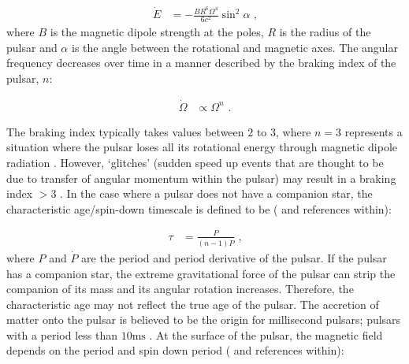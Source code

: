 \begin{equation}
    \begin{aligned}
    \dot{E}&=-\frac{BR^6\Omega^4}{6c^2}\sin^2\alpha\text{ ,}
    \end{aligned}
\end{equation}
where $B$ is the magnetic dipole strength at the poles, $R$ is the radius of the pulsar and $\alpha$ is the angle between the rotational and magnetic axes. The angular frequency decreases over time in a manner described by the braking index of the pulsar, $n$:

\begin{equation}
    \begin{aligned}
    \dot{\Omega} &\propto \Omega^n\text{ .}
    \end{aligned}
\end{equation}

The braking index typically takes values between $2\text{ to }3$, where $n=3$ represents a situation where the pulsar loses all its rotational energy through magnetic dipole radiation \citep{2007Ap&SS.308..317L}. However, `glitches' (sudden speed up events that are thought to be due to transfer of angular momentum within the pulsar) may result in a braking index $>3$ \citep{2019MNRAS.489.3810P,2020MNRAS.494.2012P}. In the case where a pulsar does not have a companion star, the characteristic age/spin-down timescale is defined to be (\cite{2007ASSL..326.....H} and references within):

\begin{equation}
    \begin{aligned}
    \tau&=\frac{P}{(n-1)\dot{P}} \text{ ,}
    \end{aligned} \label{eq:chapter1_characteristic_age}
\end{equation}
\noindent where $P$ and $\dot{P}$ are the period and period derivative of the pulsar. If the pulsar has a companion star, the extreme gravitational force of the pulsar can strip the companion of its mass and its angular rotation increases. Therefore, the characteristic age may not reflect the true age of the pulsar. The accretion of matter onto the pulsar is believed to be the origin for millisecond pulsars; pulsars with a period less than $10\si{\milli\second}$ \citep{1982Natur.300..728A}.
\newpar
At the surface of the pulsar, the magnetic field depends on the period and spin down period (\cite{2012hpa..book.....L} and references within):

